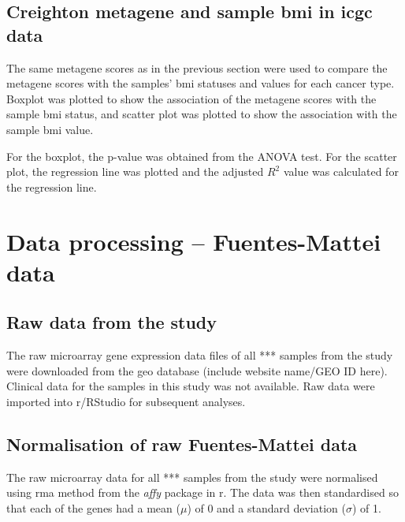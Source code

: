 \subsection{Creighton metagene and sample \gls{bmi} in \gls{icgc} data}
\label{subsec:crmetaicgcge}

The same \gls{metagene} scores as in the previous section were used to compare the \gls{metagene} scores with the samples' \gls{bmi} statuses and values for each cancer type.
Boxplot was plotted to show the association of the \gls{metagene} scores with the sample \gls{bmi} status, and scatter plot was plotted to show the association with the sample \gls{bmi} value.

For the boxplot, the p-value was obtained from the ANOVA test.
For the scatter plot, the regression line was plotted and the adjusted $R^2$ value was calculated for the regression line.


\section{Data processing -- Fuentes-Mattei data}
\label{sec:dataprocessingfm}

\subsection{Raw data from the \citet{Fuentes-Mattei2014} study}
\label{subsec:rawdatafm}

The raw microarray gene expression data files of all *** samples from the  \citet{Fuentes-Mattei2014} study were downloaded from the \gls{geo} database (include website name/GEO ID here).
Clinical data for the samples in this study was not available.
Raw data were imported into \gls{r}/RStudio for subsequent analyses.


\subsection{Normalisation of raw Fuentes-Mattei data}
\label{subsec:normfmdata}

The raw microarray data for all *** samples from the study were normalised using \gls{rma} method from the \textit{affy} package in \gls{r}.
The data was then standardised so that each of the genes had a mean ($\mu$) of 0 and a standard deviation ($\sigma$) of 1.

